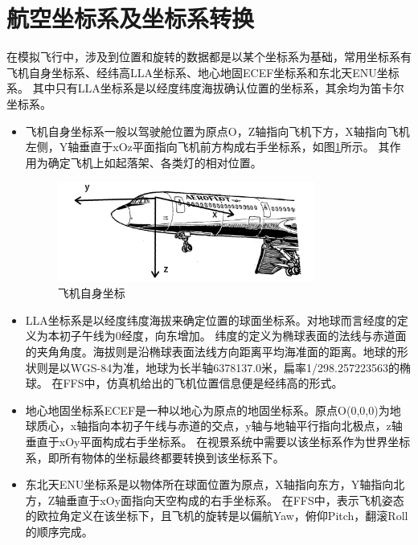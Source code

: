 \section{航空坐标系及坐标系转换}
在模拟飞行中，涉及到位置和旋转的数据都是以某个坐标系为基础，常用坐标系有飞机自身坐标系、经纬高LLA坐标系、地心地固ECEF坐标系和东北天ENU坐标系。
其中只有LLA坐标系是以经度纬度海拔确认位置的坐标系，其余均为笛卡尔坐标系。
\begin{itemize}
    \item [（1）]
    飞机自身坐标系一般以驾驶舱位置为原点O，Z轴指向飞机下方，X轴指向飞机左侧，Y轴垂直于xOz平面指向飞机前方构成右手坐标系，如图\ref{crood1}所示。
    其作用为确定飞机上如起落架、各类灯的相对位置\cite{crood4}。
    \begin{figure}[h!]
        \begin{center}
            \includegraphics[width=0.8\textwidth]{pictures/plane.png}
            \caption{飞机自身坐标}
            \label{crood1}
        \end{center}
    \end{figure}
    \item [（2）]
    LLA坐标系是以经度纬度海拔来确定位置的球面坐标系。对地球而言经度的定义为本初子午线为0经度，向东增加。
    纬度的定义为椭球表面的法线与赤道面的夹角角度。海拔则是沿椭球表面法线方向距离平均海准面的距离。地球的形状则是以WGS-84为准，地球为长半轴6378137.0米，扁率1/298.257223563的椭球\cite{crood1}。
    在FFS中，仿真机给出的飞机位置信息便是经纬高的形式。
    \item [（3）]
    地心地固坐标系ECEF是一种以地心为原点的地固坐标系。原点O(0,0,0)为地球质心，x轴指向本初子午线与赤道的交点，y轴与地轴平行指向北极点，z轴垂直于xOy平面构成右手坐标系\cite{crood2}。
    在视景系统中需要以该坐标系作为世界坐标系，即所有物体的坐标最终都要转换到该坐标系下。
    \item [（4）]
    东北天ENU坐标系是以物体所在球面位置为原点，X轴指向东方，Y轴指向北方，Z轴垂直于xOy面指向天空构成的右手坐标系\cite{crood3}。
    在FFS中，表示飞机姿态的欧拉角定义在该坐标下，且飞机的旋转是以偏航Yaw，俯仰Pitch，翻滚Roll的顺序完成。
    \begin{figure}[h!]

\end{figure}
\end{itemize}
